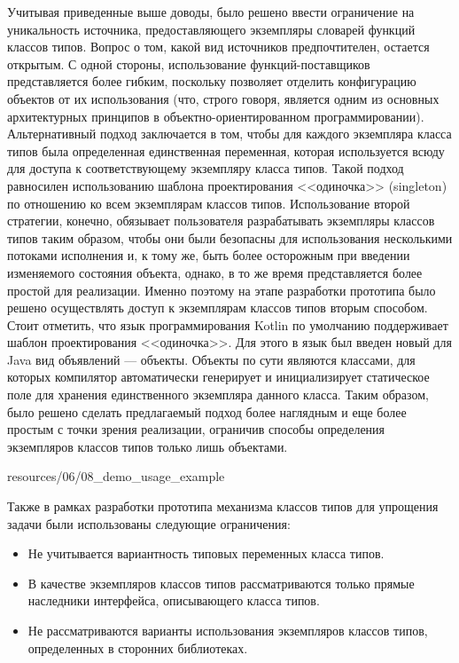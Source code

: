 Учитывая приведенные выше доводы, было решено ввести ограничение на уникальность источника, предоставляющего экземпляры словарей функций классов типов. Вопрос о том, какой вид источников предпочтителен, остается открытым. С одной стороны, использование функций-поставщиков представляется более гибким, поскольку позволяет отделить конфигурацию объектов от их использования (что, строго говоря, является одним из основных архитектурных принципов в объектно-ориентированном программировании). Альтернативный подход заключается в том, чтобы для каждого экземпляра класса типов была определенная единственная переменная, которая используется всюду для доступа к соответствующему экземпляру класса типов. Такой подход равносилен использованию шаблона проектирования <<одиночка>> (singleton)~\cite[стр.~177--189]{Martin03} по отношению ко всем экземплярам классов типов. Использование второй стратегии, конечно, обязывает пользователя разрабатывать экземпляры классов типов таким образом, чтобы они были безопасны для использования несколькими потоками исполнения и, к тому же, быть более осторожным при введении изменяемого состояния объекта, однако, в то же время представляется более простой для реализации. Именно поэтому на этапе разработки прототипа было решено осуществлять доступ к экземплярам классов типов вторым способом. Стоит отметить, что язык программирования Kotlin по умолчанию поддерживает шаблон проектирования <<одиночка>>. Для этого в язык был введен новый для Java вид объявлений --- объекты. Объекты по сути являются классами, для которых компилятор автоматически генерирует и инициализирует статическое поле для хранения единственного экземпляра данного класса. Таким образом, было решено сделать предлагаемый подход более наглядным и еще более простым с точки зрения реализации, ограничив способы определения экземпляров классов типов только лишь объектами. 


{resources/06/08_demo_usage_example}

Также в рамках разработки прототипа механизма классов типов для упрощения задачи были использованы следующие ограничения:
\begin{itemize}
    \item Не учитывается вариантность типовых переменных класса типов.
    \item В качестве экземпляров классов типов рассматриваются только прямые наследники интерфейса, описывающего класса типов.
    \item Не рассматриваются варианты использования экземпляров классов типов, определенных в сторонних библиотеках.
\end{itemize}

